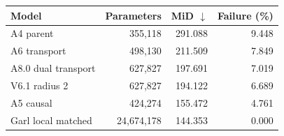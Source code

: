 \begin{tabular}{lrrr}
\toprule
Model & Parameters & MiD $\downarrow$ & Failure (\%) \\
\midrule
A4 parent & 355,118 & 291.088 & 9.448 \\
A6 transport & 498,130 & 211.509 & 7.849 \\
A8.0 dual transport & 627,827 & 197.691 & 7.019 \\
V6.1 radius 2 & 627,827 & 194.122 & 6.689 \\
A5 causal & 424,274 & 155.472 & 4.761 \\
Garl local matched & 24,674,178 & 144.353 & 0.000 \\
\bottomrule
\end{tabular}
